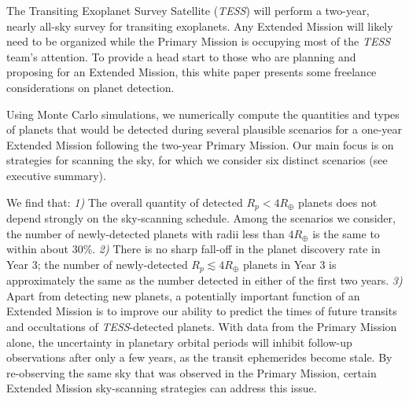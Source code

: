 \documentclass{article}
\begin{document}
The Transiting Exoplanet Survey Satellite (\textit{TESS}) will perform a
two-year, nearly all-sky survey for transiting exoplanets.  Any Extended
Mission will likely need to be organized while the Primary Mission is occupying
most of the \textit{TESS} team's attention.  To provide a head start to those
who are planning and proposing for an Extended Mission, this white paper
presents some freelance considerations on planet detection.

Using Monte Carlo simulations, we numerically compute the quantities and types
of planets that would be detected during several plausible scenarios for a
one-year Extended Mission following the two-year Primary Mission. Our main
focus is on strategies for scanning the sky, for which we consider six
distinct scenarios (see executive summary). 

We find that: \textit{1)} The overall quantity of detected $R_p<4R_\oplus$
planets does not depend strongly on the sky-scanning schedule.  Among the
scenarios we consider, the number of newly-detected planets with radii less
than $4R_\oplus$ is the same to within about 30\%.  \textit{2)} There is no
sharp fall-off in the planet discovery rate in Year 3; the number of
newly-detected $R_p \lesssim 4R_\oplus$ planets in Year 3
is approximately the same as the number detected in either of the first two
years.
\textit{3)} Apart from detecting new planets, a potentially important function
of an Extended Mission is to improve our ability to predict the times of future
transits and occultations of {\it TESS}-detected planets.  With data from the
Primary Mission alone, the uncertainty in planetary orbital periods will
inhibit follow-up observations after only a few years, as the transit
ephemerides become stale. By re-observing the same sky that was observed in the
Primary Mission, certain Extended Mission sky-scanning strategies can address
this issue.
\end{document}
